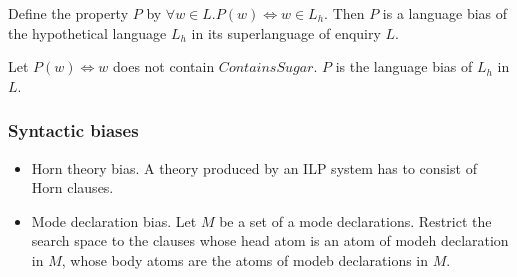 \begin{exmp}
Define the property $P$ by $\forall w \in L. P(w) \iff w \in L_h$. Then $P$ is a language bias of the hypothetical language $L_h$ in its superlanguage of enquiry $L$.
\end{exmp}

\begin{exmp}
Let $P(w) \iff w$ does not contain $ContainsSugar$. $P$ is the language bias of $L_h$ in $L$.
\end{exmp}

\subsubsection{Syntactic biases}
\begin{itemize}
\item Horn theory bias. A theory produced by an ILP system has to consist of Horn clauses.
\item Mode declaration bias. Let $M$ be a set of a mode declarations.\cite{muggleton1995} Restrict the search space to the clauses whose head atom is an atom of modeh declaration in $M$, whose body atoms are the atoms of modeb declarations in $M$.
\end{itemize}

